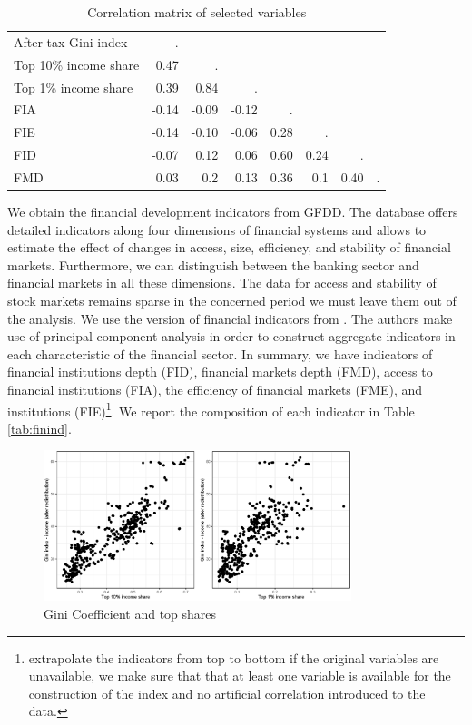 \documentclass[preprint, nonatbib, 10pt]{elsarticle}
\begin{document}
\begin{table}[ht!]
  \small
  \caption{Correlation matrix of selected variables}
  \label{tab:corr}
  \centering
  \begin{tabular}{lrrrrrrr}
    \toprule
    After-tax Gini index  & . &  &  &  &  &  &  \\
    Top 10\% income share & 0.47 & . &  &  &  &  &  \\ 
    Top 1\% income share & 0.39 & 0.84 & . &  &  &  &  \\
    FIA & -0.14 & -0.09 & -0.12 & . &  &  &  \\
    FIE & -0.14 & -0.10 & -0.06 & 0.28 & . &  &  \\ 
    FID & -0.07 & 0.12 & 0.06 & 0.60 & 0.24 & . &  \\
    FMD & 0.03 & 0.2 & 0.13 & 0.36 & 0.1 & 0.40 & . \\ 
     \bottomrule
  \end{tabular}
  \end{table}

  We obtain the financial development indicators from \ac{GFDD}. The database offers detailed indicators along four dimensions of financial systems and allows to estimate the effect of changes in access, size, efficiency, and stability of financial markets. Furthermore, we can distinguish between the banking sector and financial markets in all these dimensions. The data for access and stability of stock markets remains sparse in the concerned period we must leave them out of the analysis. We use the version of financial indicators from \textcite{svirydzenka2016introducing}. The authors make use of principal component analysis in order to construct aggregate indicators in each characteristic of the financial sector. In summary, we have indicators of financial institutions depth (FID), financial markets depth (FMD), access to financial institutions (FIA), the efficiency of financial markets (FME), and institutions (FIE)\footnote{\textcite{svirydzenka2016introducing} extrapolate the indicators from top to bottom if the original variables are unavailable, we make sure that that at least one variable is available for the construction of the index and no artificial correlation introduced to the data.}. We report the composition of each indicator in Table \ref{tab:finind}. 

\begin{figure}[ht!]
  \caption{Gini Coefficient and top shares}
  \label{fig:gini_topshares}
  \centering
  \includegraphics[width=0.8\textwidth, keepaspectratio]{figures//plots_ineq}
\end{figure}
\end{document}
